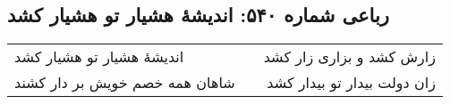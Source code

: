 \begin{center}
\section*{رباعی شماره ۵۴۰: اندیشهٔ هشیار تو هشیار کشد}
\label{sec:0540}
\begin{longtable}{l p{0.5cm} r}
اندیشهٔ هشیار تو هشیار کشد
&&
زارش کشد و بزاری زار کشد
\\
شاهان همه خصم خویش بر دار کشند
&&
زان دولت بیدار تو بیدار کشد
\\
\end{longtable}
\end{center}
